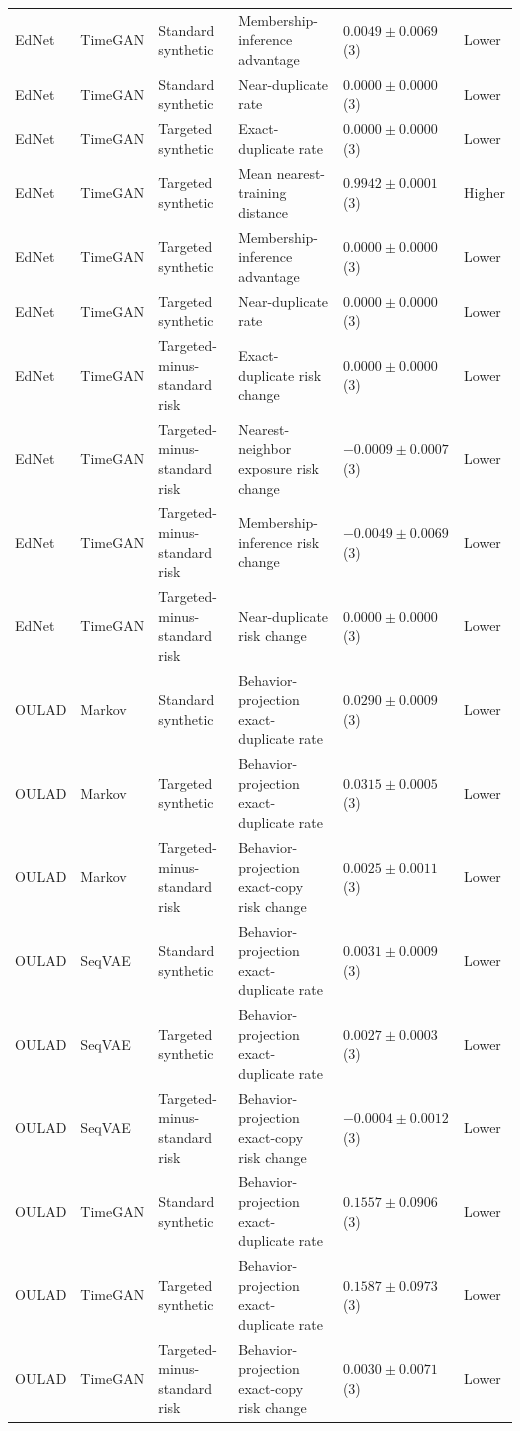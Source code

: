 \begin{longtable}{@{}p{2.25cm}p{2.05cm}p{4.7cm}p{5.0cm}p{2.6cm}p{1.25cm}@{}}
EdNet & TimeGAN & Standard synthetic & Membership-inference advantage & $0.0049 \mathbin{\pm} 0.0069$ (3) & Lower \\
EdNet & TimeGAN & Standard synthetic & Near-duplicate rate & $0.0000 \mathbin{\pm} 0.0000$ (3) & Lower \\
EdNet & TimeGAN & Targeted synthetic & Exact-duplicate rate & $0.0000 \mathbin{\pm} 0.0000$ (3) & Lower \\
EdNet & TimeGAN & Targeted synthetic & Mean nearest-training distance & $0.9942 \mathbin{\pm} 0.0001$ (3) & Higher \\
EdNet & TimeGAN & Targeted synthetic & Membership-inference advantage & $0.0000 \mathbin{\pm} 0.0000$ (3) & Lower \\
EdNet & TimeGAN & Targeted synthetic & Near-duplicate rate & $0.0000 \mathbin{\pm} 0.0000$ (3) & Lower \\
EdNet & TimeGAN & Targeted-minus-standard risk & Exact-duplicate risk change & $0.0000 \mathbin{\pm} 0.0000$ (3) & Lower \\
EdNet & TimeGAN & Targeted-minus-standard risk & Nearest-neighbor exposure risk change & $-0.0009 \mathbin{\pm} 0.0007$ (3) & Lower \\
EdNet & TimeGAN & Targeted-minus-standard risk & Membership-inference risk change & $-0.0049 \mathbin{\pm} 0.0069$ (3) & Lower \\
EdNet & TimeGAN & Targeted-minus-standard risk & Near-duplicate risk change & $0.0000 \mathbin{\pm} 0.0000$ (3) & Lower \\
OULAD & Markov & Standard synthetic & Behavior-projection exact-duplicate rate & $0.0290 \mathbin{\pm} 0.0009$ (3) & Lower \\
OULAD & Markov & Targeted synthetic & Behavior-projection exact-duplicate rate & $0.0315 \mathbin{\pm} 0.0005$ (3) & Lower \\
OULAD & Markov & Targeted-minus-standard risk & Behavior-projection exact-copy risk change & $0.0025 \mathbin{\pm} 0.0011$ (3) & Lower \\
OULAD & SeqVAE & Standard synthetic & Behavior-projection exact-duplicate rate & $0.0031 \mathbin{\pm} 0.0009$ (3) & Lower \\
OULAD & SeqVAE & Targeted synthetic & Behavior-projection exact-duplicate rate & $0.0027 \mathbin{\pm} 0.0003$ (3) & Lower \\
OULAD & SeqVAE & Targeted-minus-standard risk & Behavior-projection exact-copy risk change & $-0.0004 \mathbin{\pm} 0.0012$ (3) & Lower \\
OULAD & TimeGAN & Standard synthetic & Behavior-projection exact-duplicate rate & $0.1557 \mathbin{\pm} 0.0906$ (3) & Lower \\
OULAD & TimeGAN & Targeted synthetic & Behavior-projection exact-duplicate rate & $0.1587 \mathbin{\pm} 0.0973$ (3) & Lower \\
OULAD & TimeGAN & Targeted-minus-standard risk & Behavior-projection exact-copy risk change & $0.0030 \mathbin{\pm} 0.0071$ (3) & Lower \\
\end{longtable}
